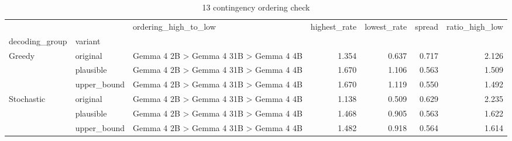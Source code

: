 \begin{table}
\caption{13 contingency ordering check}
\begin{tabular}{lllrrrr}
\toprule
 &  & ordering\_high\_to\_low & highest\_rate & lowest\_rate & spread & ratio\_high\_low \\
decoding_group & variant &  &  &  &  &  \\
\midrule
\multirow[t]{3}{*}{Greedy} & original & Gemma 4 2B > Gemma 4 31B > Gemma 4 4B & 1.354 & 0.637 & 0.717 & 2.126 \\
 & plausible & Gemma 4 2B > Gemma 4 31B > Gemma 4 4B & 1.670 & 1.106 & 0.563 & 1.509 \\
 & upper\_bound & Gemma 4 2B > Gemma 4 31B > Gemma 4 4B & 1.670 & 1.119 & 0.550 & 1.492 \\
\cline{1-7}
\multirow[t]{3}{*}{Stochastic} & original & Gemma 4 2B > Gemma 4 31B > Gemma 4 4B & 1.138 & 0.509 & 0.629 & 2.235 \\
 & plausible & Gemma 4 2B > Gemma 4 31B > Gemma 4 4B & 1.468 & 0.905 & 0.563 & 1.622 \\
 & upper\_bound & Gemma 4 2B > Gemma 4 31B > Gemma 4 4B & 1.482 & 0.918 & 0.564 & 1.614 \\
\cline{1-7}
\bottomrule
\end{tabular}
\end{table}
